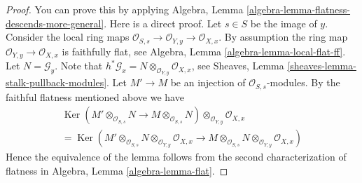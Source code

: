 \documentclass[10pt,a4paper]{amsart}
\theoremstyle{plain}
\theoremstyle{definition}
\theoremstyle{remark}
\numberwithin{equation}{subsection}
\def\Ker{\mathop{\mathrm{Ker}}}
\begin{document}
\begin{proof}
You can prove this by applying
Algebra, Lemma \ref{algebra-lemma-flatness-descends-more-general}.
Here is a direct proof. Let $s \in S$ be the image of $y$.
Consider the local ring maps
$\mathcal{O}_{S, s} \to \mathcal{O}_{Y, y} \to \mathcal{O}_{X, x}$.
By assumption the ring map $\mathcal{O}_{Y, y} \to \mathcal{O}_{X, x}$
is faithfully flat, see
Algebra, Lemma \ref{algebra-lemma-local-flat-ff}.
Let $N = \mathcal{G}_y$. Note that
$h^*\mathcal{G}_x = N \otimes_{\mathcal{O}_{Y, y}} \mathcal{O}_{X, x}$, see
Sheaves, Lemma \ref{sheaves-lemma-stalk-pullback-modules}.
Let $M' \to M$ be an injection of $\mathcal{O}_{S, s}$-modules.
By the faithful flatness mentioned above we have
\begin{align*}
\Ker(
M' \otimes_{\mathcal{O}_{S, s}} N \to M \otimes_{\mathcal{O}_{S, s}} N)
\otimes_{\mathcal{O}_{Y, y}} \mathcal{O}_{X, x} \\
=
\Ker(
M' \otimes_{\mathcal{O}_{S, s}} N
\otimes_{\mathcal{O}_{Y, y}} \mathcal{O}_{X, x}
\to
M \otimes_{\mathcal{O}_{S, s}} N
\otimes_{\mathcal{O}_{Y, y}} \mathcal{O}_{X, x})
\end{align*}
Hence the equivalence of the lemma follows from the second characterization
of flatness in
Algebra, Lemma \ref{algebra-lemma-flat}.
\end{proof}
\end{document}
